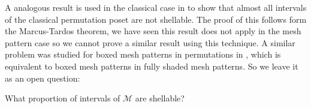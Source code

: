 \documentclass[11pt,a4paper,oneside]{article}
\begin{document}
A analogous result is used in the classical case in \cite{McSt13} to show that almost all intervals of the classical permutation poset are not shellable. The proof of this follows form the Marcus-Tardos theorem, we have seen this result does not apply in the mesh pattern case so we cannot prove a similar result using this technique.  A similar problem was studied for boxed mesh patterns in permutations in \cite{AKV13}, which is equivalent to boxed mesh patterns in fully shaded mesh patterns. So we leave it as an open question:

\begin{que}
What proportion of intervals of $\mathcal{M}$ are shellable?
\end{que}




\end{document}
